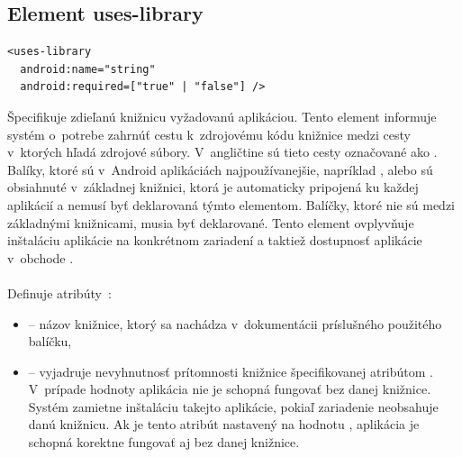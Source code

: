 \subsection{Element uses-library}
\lstset{language=XML}
\begin{lstlisting}
<uses-library
  android:name="string"
  android:required=["true" | "false"] />
\end{lstlisting}
Špecifikuje zdieľanú knižnicu vyžadovanú aplikáciou. Tento element informuje systém o~potrebe zahrnúť cestu k~zdrojovému kódu knižnice medzi cesty v~ktorých  hľadá zdrojové súbory. V~angličtine sú tieto cesty označované ako . Balíky, ktoré sú v~Android aplikáciách najpoužívanejšie, napríklad ,  alebo  sú obsiahnuté v~základnej knižnici, ktorá je automaticky pripojená ku každej aplikácií a nemusí byť deklarovaná týmto elementom. Balíčky, ktoré nie sú medzi základnými knižnicami, musia byť deklarované.  Tento element ovplyvňuje inštaláciu aplikácie na konkrétnom zariadení a taktiež dostupnosť aplikácie v~obchode .\\\\ Definuje atribúty~\cite{elUsesLib}:\\
\begin{itemize}
\item {} -- názov knižnice, ktorý sa nachádza v~dokumentácii príslušného použitého balíčku,
\item {} -- vyjadruje nevyhnutnosť prítomnosti knižnice špecifikovanej atribútom . V~prípade hodnoty  aplikácia nie je schopná fungovať bez danej knižnice. Systém zamietne inštaláciu takejto aplikácie, pokiaľ zariadenie neobsahuje danú knižnicu. Ak je tento atribút nastavený na hodnotu , aplikácia je schopná korektne fungovať aj bez danej knižnice.
\end{itemize}